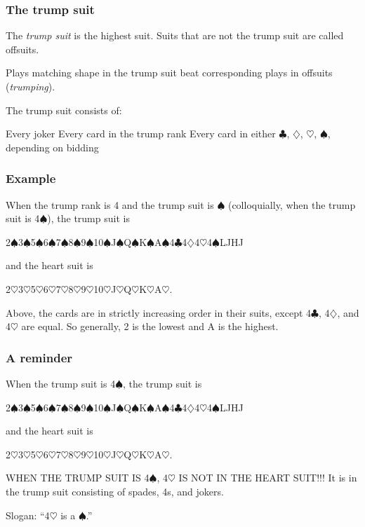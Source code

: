 \documentclass{beamer}
\renewcommand{\c}{$\clubsuit$}
\renewcommand{\d}{$\diamondsuit$}
\newcommand{\h}{$\heartsuit$}
\newcommand{\s}{$\spadesuit$}
\begin{document}
\begin{frame}
	\frametitle{The trump suit}
	The \emph{trump suit} is the \alert{highest suit}. Suits that are not the trump suit are called \alert{offsuits}.

	\medskip
	
	Plays matching shape in the trump suit beat corresponding plays in offsuits (\emph{trumping}).

	\medskip

	The trump suit consists of:
	\begin{itemize}
		\ii Every joker
		\ii Every card in the trump rank
		\ii Every card in either \c, \d, \h, \s, depending on bidding
	\end{itemize}

\end{frame}

\begin{frame}
	\frametitle{Example}
	When the trump rank is 4 and the trump suit is \s{} (colloquially, when the trump suit is 4\s), the trump suit is 
	\begin{center}
		2\s3\s5\s6\s7\s8\s9\s10\s J\s Q\s K\s A\s 4\c 4\d 4\h 4\s LJHJ
	\end{center}
	and the heart suit is
	\begin{center}
		2\h 3\h 5\h 6\h 7\h 8\h 9\h 10\h J\h Q\h K\h A\h.
	\end{center}
	Above, the cards are in strictly increasing order in their suits, except 4\c, 4\d, and 4\h{} are equal. So generally, 2 is the lowest and A is the highest.
\end{frame}

\begin{frame}
	\frametitle{A reminder}
	When the trump suit is 4\s, the trump suit is
	\begin{center}
		2\s3\s5\s6\s7\s8\s9\s10\s J\s Q\s K\s A\s 4\c 4\d 4\h 4\s LJHJ
	\end{center}
	and the heart suit is
	\begin{center}
		2\h 3\h 5\h 6\h 7\h 8\h 9\h 10\h J\h Q\h K\h A\h.
	\end{center}

	\begin{center}
		\alert{WHEN THE TRUMP SUIT IS 4\s, 4\h{} IS NOT IN THE HEART SUIT!!!} It is in the trump suit consisting of spades, 4s, and jokers.

		\medskip

		Slogan: ``4\h{} is a \s.''
	\end{center}
\end{frame}
\end{document}
